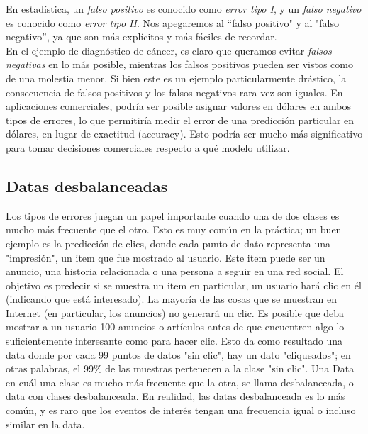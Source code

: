 {En estadística, un \emph{falso positivo} es conocido como \emph{error tipo I}, y un \emph{falso negativo} es conocido como \emph{ error tipo II}.  Nos apegaremos  al   “{}falso positivo"{} y al "falso negativo”,  ya que son más explícitos y más fáciles de recordar. \\

En el ejemplo de diagnóstico de cáncer, es claro que queramos evitar \emph{falsos negativas} en lo más posible, mientras los falsos positivos pueden ser vistos como de una molestia menor.  Si bien este es un ejemplo particularmente drástico, la consecuencia de falsos positivos y los falsos negativos rara vez son iguales.   En aplicaciones comerciales, podría ser posible asignar valores en dólares en ambos 
tipos de errores, lo que permitiría medir el error de una predicción particular en 
dólares, en lugar de exactitud (accuracy). Esto podría ser mucho más significativo para tomar 
decisiones comerciales respecto a qué modelo utilizar.


\subsection{Datas desbalanceadas}



Los tipos de errores juegan un papel importante cuando una de dos clases es mucho más frecuente
que el otro.  Esto es muy común en la práctica;  un buen ejemplo es la predicción de clics, donde cada punto de dato representa una "{}impresión"{}, un item que fue  mostrado al  usuario.   Este item  puede ser un anuncio, una historia relacionada o una persona a seguir en una red social. El objetivo es predecir si  se muestra un item en particular, un usuario hará clic en él (indicando que está interesado). La mayoría de las cosas que se muestran en Internet (en particular, los anuncios) no generará un clic. Es posible que deba mostrar a un usuario 100 anuncios o artículos antes de que encuentren algo lo suficientemente interesante como para hacer clic.  Esto da como resultado una data  donde por cada 99 puntos de datos "{}sin clic"{}, hay un dato  "{}cliqueados"{}; en otras palabras, el 99\% de las muestras pertenecen a la clase "{}sin clic"{}.  Una Data en cuál una  clase es mucho más frecuente que la otra, se llama desbalanceada,  o data con clases desbalanceada.  En realidad,  las datas desbalanceada es lo más común, y es raro que los eventos de interés tengan una frecuencia igual o incluso similar en la data.\\

}
